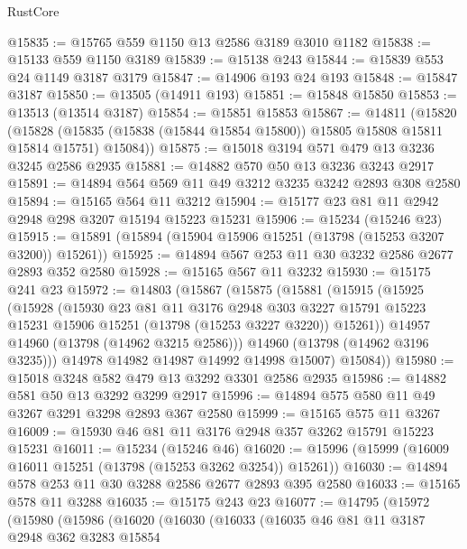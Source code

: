 \begin{lexlean}{RustCore}
\begin{coremodule}
@15835 := @15765 @559 @1150 @13 @2586 @3189 @3010 @1182
@15838 := @15133 @559 @1150 @3189
@15839 := @15138 @243
@15844 := @15839 @553 @24 @1149 @3187 @3179
@15847 := @14906 @193 @24 @193
@15848 := @15847 @3187
@15850 := @13505 (@14911 @193)
@15851 := @15848 @15850
@15853 := @13513 (@13514 @3187)
@15854 := @15851 @15853
@15867 := @14811
    (@15820
      (@15828 (@15835 (@15838 (@15844 @15854 @15800)) @15805 @15808 @15811 @15814 @15751) @15084))
@15875 := @15018 @3194 @571 @479 @13 @3236 @3245 @2586 @2935
@15881 := @14882 @570 @50 @13 @3236 @3243 @2917
@15891 := @14894 @564 @569 @11 @49 @3212 @3235 @3242 @2893 @308 @2580
@15894 := @15165 @564 @11 @3212
@15904 := @15177 @23 @81 @11 @2942 @2948 @298 @3207 @15194 @15223 @15231
@15906 := @15234 (@15246 @23)
@15915 := @15891 (@15894 (@15904 @15906 @15251 (@13798 (@15253 @3207 @3200)) @15261))
@15925 := @14894 @567 @253 @11 @30 @3232 @2586 @2677 @2893 @352 @2580
@15928 := @15165 @567 @11 @3232
@15930 := @15175 @241 @23
@15972 := @14803
    (@15867
      (@15875
        (@15881
          (@15915
            (@15925
              (@15928
                (@15930
                  @23
                  @81
                  @11
                  @3176
                  @2948
                  @303
                  @3227
                  @15791
                  @15223
                  @15231
                  @15906
                  @15251
                  (@13798 (@15253 @3227 @3220))
                  @15261))
              @14957
              @14960
              (@13798 (@14962 @3215 @2586)))
            @14960
            (@13798 (@14962 @3196 @3235)))
          @14978
          @14982
          @14987
          @14992
          @14998
          @15007)
        @15084))
@15980 := @15018 @3248 @582 @479 @13 @3292 @3301 @2586 @2935
@15986 := @14882 @581 @50 @13 @3292 @3299 @2917
@15996 := @14894 @575 @580 @11 @49 @3267 @3291 @3298 @2893 @367 @2580
@15999 := @15165 @575 @11 @3267
@16009 := @15930 @46 @81 @11 @3176 @2948 @357 @3262 @15791 @15223 @15231
@16011 := @15234 (@15246 @46)
@16020 := @15996 (@15999 (@16009 @16011 @15251 (@13798 (@15253 @3262 @3254)) @15261))
@16030 := @14894 @578 @253 @11 @30 @3288 @2586 @2677 @2893 @395 @2580
@16033 := @15165 @578 @11 @3288
@16035 := @15175 @243 @23
@16077 := @14795
    (@15972
      (@15980
        (@15986
          (@16020
            (@16030
              (@16033
                (@16035
                  @46
                  @81
                  @11
                  @3187
                  @2948
                  @362
                  @3283
                  @15854

\end{coremodule}
\end{lexlean}
